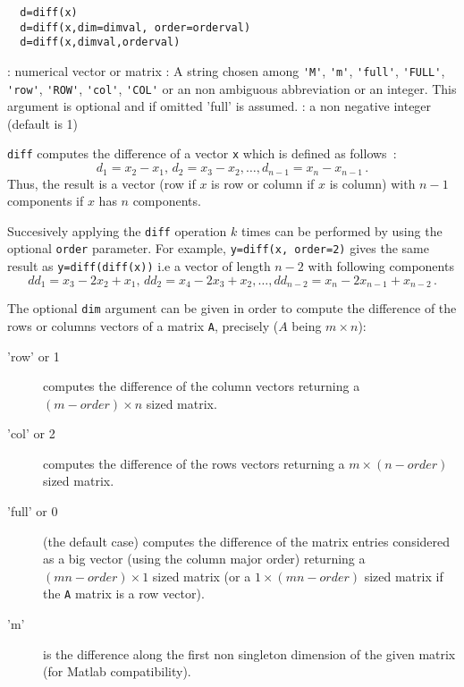 \begin{mandesc}
\end{mandesc}
\begin{calling_sequence}
\begin{verbatim}
  d=diff(x)  
  d=diff(x,dim=dimval, order=orderval)  
  d=diff(x,dimval,orderval)
\end{verbatim}
\end{calling_sequence}
\begin{parameters}
  \begin{varlist}
    : numerical vector or matrix
    : A string chosen among \verb+'M'+, \verb+'m'+, \verb+'full'+, \verb+'FULL'+, \verb+'row'+,
    \verb+'ROW'+, \verb+'col'+, \verb+'COL'+ or an non ambiguous abbreviation or an integer. 
    This argument is optional and if omitted 'full' is assumed.
    : a non negative integer (default is 1)   
  \end{varlist}
\end{parameters}
\begin{mandescription}
  \verb+diff+ computes the difference of a vector \verb+x+ which is defined as follows~:
$$ d_1 = x_2 - x_1, \, d_2 = x_3 - x_2, \ldots, d_{n-1} = x_{n} - x_{n-1}\,.
$$
 Thus, the result is a vector (row if $x$ is row or column if $x$ is column) with 
 $n-1$ components if $x$ has $n$ components.

 Succesively applying the \verb+diff+ operation $k$ times can be performed by 
 using the optional \verb!order! parameter. For example, \verb+y=diff(x, order=2)+ gives 
 the same result as \verb+y=diff(diff(x))+ i.e a vector of length $n-2$ with following 
 components 
$$          
dd_1 = x_3 - 2x_2 + x_1, \, dd_2 = x_4 - 2x_3 + x_2, \ldots, dd_{n-2} = x_n  - 2x_{n-1} + x_{n-2} \,.
$$

The optional \verb!dim! argument can be given in order to compute the difference of the rows or columns vectors
of a matrix \verb+A+, precisely ($A$ being $m \times n$):
  \begin{description}
    \item['row' or 1]  computes the difference of the column vectors returning a $(m-order) \times n$ sized matrix.
    \item['col' or 2]  computes the difference of the rows vectors returning a $m \times (n-order)$ sized matrix.
    \item['full' or 0] (the default case) computes the difference of the matrix entries considered as 
           a big vector (using the column major order) returning a $(mn - order) \times 1$ sized matrix (or 
           a $1 \times (mn - order)$ sized matrix if the \verb+A+ matrix is a row vector).
    \item['m'] is the difference along the first non singleton dimension of the given matrix
          (for Matlab compatibility). 
  \end{description}
\end{mandescription}
